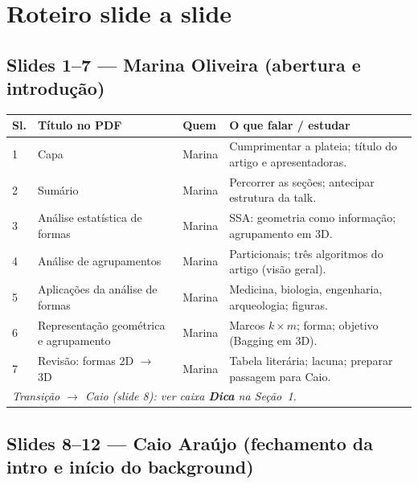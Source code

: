 \documentclass[12pt,a4paper]{article}
\begin{document}
\section{Roteiro slide a slide}

\subsection{Slides 1--7 --- Marina Oliveira (abertura e introdução)}

\begin{longtable}{@{}p{1.1cm}p{5.2cm}p{2cm}p{5.9cm}@{}}
\toprule
\textbf{Sl.} & \textbf{Título no PDF} & \textbf{Quem} & \textbf{O que falar / estudar} \\
\midrule
\endhead
1 & Capa & Marina & Cumprimentar a plateia; título do artigo e apresentadoras. \\
2 & Sumário & Marina & Percorrer as seções; antecipar estrutura da talk. \\
3 & Análise estatística de formas & Marina & SSA: geometria como informação; agrupamento em 3D. \\
4 & Análise de agrupamentos & Marina & Particionais; três algoritmos do artigo (visão geral). \\
5 & Aplicações da análise de formas & Marina & Medicina, biologia, engenharia, arqueologia; figuras. \\
6 & Representação geométrica e agrupamento & Marina & Marcos $k\times m$; forma; objetivo (Bagging em 3D). \\
7 & Revisão: formas 2D $\rightarrow$ 3D & Marina & Tabela literária; lacuna; preparar passagem para Caio. \\
\midrule
\multicolumn{4}{l}{\textit{Transição $\rightarrow$ Caio (slide 8): ver caixa \textbf{Dica} na Seção~1.}} \\
\bottomrule
\end{longtable}

\subsection{Slides 8--12 --- Caio Araújo (fechamento da intro e início do background)}
\end{document}
